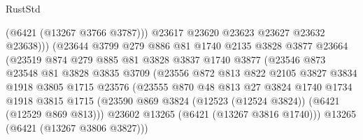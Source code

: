 \begin{lexlean}{RustStd}
\begin{coremodule}
                                  (@6421 (@13267 @3766 @3787)))
                                @23617
                                @23620
                                @23623
                                @23627
                                @23632
                                @23638)))
                          (@23644
                            @3799
                            @279
                            @886
                            @81
                            @1740
                            @2135
                            @3828
                            @3877
                            @23664
                            (@23519
                              @874
                              @279
                              @885
                              @81
                              @3828
                              @3837
                              @1740
                              @3877
                              (@23546
                                @873
                                @23548
                                @81
                                @3828
                                @3835
                                @3709
                                (@23556
                                  @872
                                  @813
                                  @822
                                  @2105
                                  @3827
                                  @3834
                                  @1918
                                  @3805
                                  @1715
                                  @23576
                                  (@23555
                                    @870
                                    @48
                                    @813
                                    @27
                                    @3824
                                    @1740
                                    @1734
                                    @1918
                                    @3815
                                    @1715
                                    (@23590
                                      @869
                                      @3824
                                      (@12523 (@12524 @3824))
                                      (@6421 (@12529 @869 @813)))
                                    @23602
                                    @13265
                                    (@6421 (@13267 @3816 @1740)))
                                  @13265
                                  (@6421 (@13267 @3806 @3827)))

\end{coremodule}
\end{lexlean}
